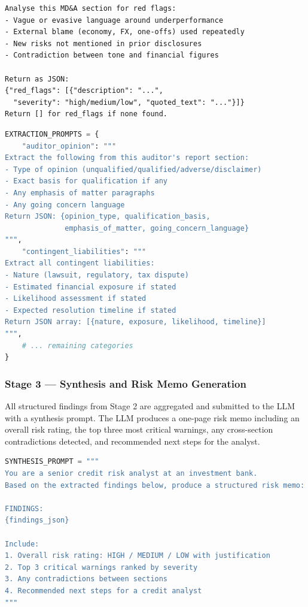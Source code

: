 \documentclass[12pt,a4paper]{article}
\begin{document}
\begin{lstlisting}[language={}, caption={Extraction prompt: MD\&A Red Flags}]
Analyse this MD&A section for red flags:
- Vague or evasive language around underperformance
- External blame (economy, FX, one-offs) used repeatedly
- New risks not mentioned in prior disclosures
- Contradiction between tone and financial figures

Return as JSON:
{"red_flags": [{"description": "...",
  "severity": "high/medium/low", "quoted_text": "..."}]}
Return [] for red_flags if none found.
\end{lstlisting}

\begin{lstlisting}[language=Python, caption={Stage 2: Category-specific extraction (auditor opinion example)}]
EXTRACTION_PROMPTS = {
    "auditor_opinion": """
Extract the following from this auditor's report section:
- Type of opinion (unqualified/qualified/adverse/disclaimer)
- Exact basis for qualification if any
- Any emphasis of matter paragraphs
- Any going concern language
Return JSON: {opinion_type, qualification_basis,
              emphasis_of_matter, going_concern_language}
""",
    "contingent_liabilities": """
Extract all contingent liabilities:
- Nature (lawsuit, regulatory, tax dispute)
- Estimated financial exposure if stated
- Likelihood assessment if stated
- Expected resolution timeline if stated
Return JSON array: [{nature, exposure, likelihood, timeline}]
""",
    # ... remaining categories
}
\end{lstlisting}

\subsubsection{Stage 3 --- Synthesis and Risk Memo Generation}

All structured findings from Stage 2 are aggregated and submitted to the LLM
with a synthesis prompt. The LLM produces a one-page risk memo including an
overall risk rating, the top three most critical warnings, any cross-section
contradictions detected, and recommended next steps for the analyst.

\begin{lstlisting}[language=Python, caption={Stage 3: Risk memo synthesis prompt}]
SYNTHESIS_PROMPT = """
You are a senior credit risk analyst at an investment bank.
Based on the extracted findings below, produce a structured risk memo:

FINDINGS:
{findings_json}

Include:
1. Overall risk rating: HIGH / MEDIUM / LOW with justification
2. Top 3 critical warnings ranked by severity
3. Any contradictions between sections
4. Recommended next steps for a credit analyst
"""
\end{lstlisting}
\end{document}
